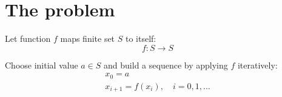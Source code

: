 \documentclass[12pt]{article}
\begin{document}
\section{The problem}

Let function $ f $ maps finite set $ S $ to itself: 
\begin{equation}
f: S \to S
\end{equation}

Choose initial value $ a \in S $ and build a sequence by applying $ f $ iteratively:
\begin{gather}
x_0 = a \\
x_{i+1} = f(x_i), \quad i = 0, 1, \ldots
\end{gather}
\end{document}
